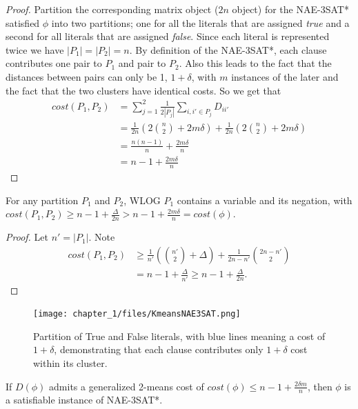 \begin{proof}
Partition the corresponding matrix object ($2n$ object) for the
NAE-3SAT* satisfied $\phi$ into two partitions; one for all the
literals that are assigned \textit{true} and a second for all literals
that are assigned \textit{false}.  Since each literal is represented
twice we have $|P_1| = |P_2| = n$.   By definition of the NAE-3SAT*,
each clause contributes one pair to $P_1$ and pair to $P_2$.   Also
this leads to the fact that the distances between pairs can only be 1,
$1+\delta$, with $m$ instances of the later and the fact that the two
clusters have identical costs. So we get that 
\begin{align*}
cost(P_1,P_2) &= \sum_{j=1}^{2} \frac{1}{2|P_j|} \sum_{i,i' \in P_j}
D_{ii'}\\ 
&= \frac{1}{2n}( 2 {n \choose 2} + 2m\delta ) + \frac{1}{2n}( 2 {n
  \choose 2} + 2m\delta ) \\ 
&= \frac{ n (n-1) } {n} + \frac{2 m \delta}{n} \\
&= n - 1 +  \frac{2 m \delta}{n}
\end{align*}
\end{proof}

\begin{lemma} \label{different-partitions}
For any partition $P_1$ and $P_2$, WLOG $P_1$ contains a variable and
its negation, with $cost(P_1,P_2) \ge n - 1 + \frac{\Delta}{2n} > n -
1 + \frac{2m\delta}{n} = cost(\phi).$ 
\end{lemma}

\begin{proof}
Let $n' = |P_1|$.  Note
\begin{align*}
cost(P_1,P_2) &\ge \frac{1}{n'}({n' \choose 2} + \Delta ) +
\frac{1}{2n-n'}{2n-n' \choose 2}  \\ 
&= n - 1 + \frac{\Delta}{n'} \ge n-1 +\frac{\Delta}{2n}.
\end{align*}
\end{proof}

\begin{figure}
    \centering
    \texttt{[image: chapter\_1/files/KmeansNAE3SAT.png]}
\centering
    \caption{Partition of True and False literals, with blue lines meaning a cost of $1+\delta$, demonstrating that each clause contributes only $1+\delta$ cost within its cluster.}
    \label{fig:my_label}
\end{figure}


\begin{lemma} \label{satisfiable-instance}
If $D(\phi)$  admits a generalized 2-means cost of $cost(\phi) \le n -
1 + \frac{2\delta m}{n}$, then $\phi$ is a satisfiable instance of
NAE-3SAT*. 
\end{lemma}

